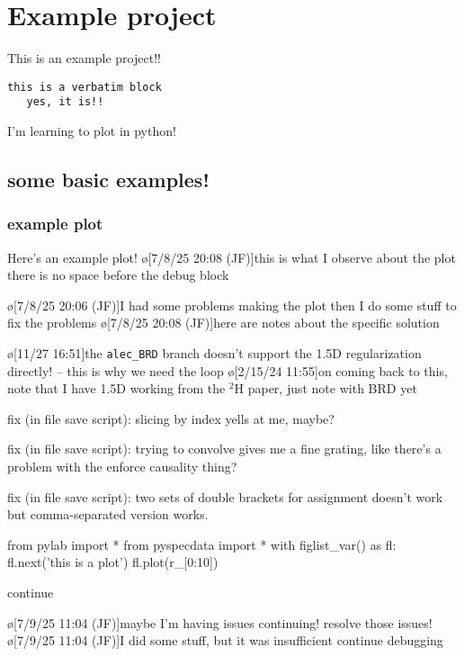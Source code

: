 \section{Example project}
This is an example project!!
\begin{verbatim}
this is a verbatim block
   yes, it is!!
\end{verbatim}
I'm learning to plot in python!

\subsection{some basic examples!}
\subsubsection{example plot}\label{sec:examplePlot1}
Here's an example plot!
\o[7/8/25 20:08 (JF)]{this is what I observe about the plot there is no space before the debug block}
\begin{err}
    \o[7/8/25 20:06 (JF)]{I had some problems making the plot}
    then I do some stuff to fix the problems
    \o[7/8/25 20:08 (JF)]{here are notes about the specific solution}
\end{err}
\o[11/27 16:51]{the \texttt{alec_BRD} branch doesn't support the 1.5D regularization directly! -- this is why we need the loop}
\o[2/15/24 11:55]{on coming back to this, note that I have 1.5D working from the $^2$H paper, just note with BRD yet}

\begin{err}
    fix (in file save script): slicing by index yells at me, maybe?

    fix (in file save script): trying to convolve gives me a fine grating, like there's a problem with the enforce causality thing?

    fix (in file save script): two sets of double brackets for assignment doesn't work but comma-separated version works.
\end{err}
\par
\begin{python}[on]
from pylab import *
from pyspecdata import *
with figlist_var() as fl:
    fl.next('this is a plot')
    fl.plot(r_[0:10])
\end{python}
\par
continue

\begin{err}
    \o[7/9/25 11:04 (JF)]{maybe I'm having issues continuing!}
    resolve those issues!
    \o[7/9/25 11:04 (JF)]{I did some stuff, but it was insufficient}
    continue debugging

\end{err}
